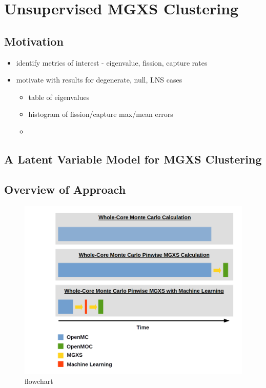 \chapter{Unsupervised MGXS Clustering}
\label{chap:methods}


\section{Motivation}
\label{sec:chap6-motivate}

\begin{itemize}[noitemsep]
  \item identify metrics of interest - eigenvalue, fission, capture rates
  \item motivate with results for degenerate, null, LNS cases
  \begin{itemize}[noitemsep]
    \item table of eigenvalues
    \item histogram of fission/capture max/mean errors
    \item 
  \end{itemize}
\end{itemize}


\section{A Latent Variable Model for MGXS Clustering}
\label{sec:chap6-latent-model}


\section{Overview of Approach}
\label{sec:chap6-overview}

\begin{figure}
  \centering
  \includegraphics[width=\linewidth]{figures/pipeline/flow-chart}
  \caption{}
\caption[flowchar]{flowchart}
\label{fig:chap6-flow-chart}
\end{figure}



